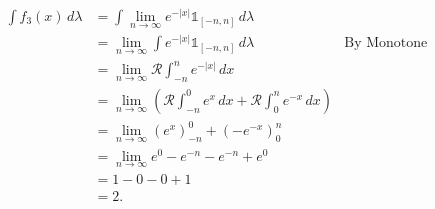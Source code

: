 \documentclass{article}
\newtheorem[M]{exe}{Exercise}
\begin{document}
\begin{align*}
    \int f_3(x) \, d\lambda&= \int \lim_{n \to \infty} e^{-|x|}\mathbb{1}_{[-n,n]} \, d\lambda  \\ 
                           &= \lim_{n\to\infty} \int e^{-|x|}\mathbb{1}_{[-n,n]} \, d\lambda&\text{By Monotone Convergence}  \\
                           &= \lim_{n\to\infty} \mathcal{R}\int_{-n}^{n} e^{-|x|} \, d x  \\
                           &= \lim_{n\to\infty} \left( \mathcal{R}\int_{-n}^{0} e^{x} \, d x +\mathcal{R}\int_{0}^{n} e^{-x} \, d x   \right)  \\
                           &= \lim_{n\to\infty} \left( e^{x} \right) _{-n}^{0}+\left( -e^{-x} \right) _0^{n} \\
                           &= \lim_{n\to\infty} e^{0}-e^{-n}-e^{-n}+e^{0} \\
                           &= 1-0-0+1 \\
                           &=2
.\end{align*}
\end{document}
